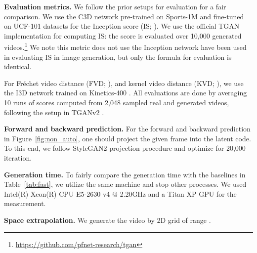 \documentclass{article} \usepackage{iclr2022_conference,times}
\begin{document}
\textbf{Evaluation metrics.}
We follow the prior setups for evaluation for a fair comparison. We use the C3D network \citep{tran2015learning} pre-trained on Sports-1M \citep{karpathy2014large} and fine-tuned on UCF-101 datasets for the Inception score (IS; \citet{salimans2016improved}). We use the official TGAN \citep{saito2017temporal} implementation for computing IS: the score is evaluated over 10,000 generated videos.\footnote{\url{https://github.com/pfnet-research/tgan}} We note this metric does not use the Inception network \citep{szegedy2016rethinking} have been used in evaluating IS in image generation, but only the formula for evaluation is identical.

For Fr\'echet video distance (FVD; \citet{unterthiner2018towards}), and kernel video distance (KVD; \citet{unterthiner2018towards}), we use the I3D network trained on Kinetics-400 \citep{kay2017kinetics}. All evaluations are done by averaging 10 runs of scores computed from 2,048 sampled real and generated videos, following the setup in TGANv2 \citep{saito2020train}.









\textbf{Forward and backward prediction.} For the forward and backward prediction in Figure~\ref{fig:non_auto}, one should project the given frame into the latent code. To this end, we follow StyleGAN2 projection procedure \cite{karras2020training} and optimize for 20,000 iteration.

\textbf{Generation time.} To fairly compare the generation time with the baselines in Table~\ref{tab:fast}, we utilize the same machine and stop other processes. We used Intel(R) Xeon(R) CPU E5-2630 v4 @ 2.20GHz and a Titan XP GPU for the measurement.

\textbf{Space extrapolation.} 
We generate the video by 2D grid of range . 
\end{document}
